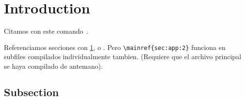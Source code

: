 \documentclass[../thesis/thesis.tex]{subfiles}
\begin{document}
\section{Introduction}\label{subsec:intro-another}

Citamos con este comando~\cite{kour2014fast}.

Referenciamos secciones con \ref{subsec:intro-another}, o . Pero \verb|\mainref{sec:app:2}| funciona en subfiles compilados individualmente tambien. (Requiere que el archivo principal se haya compilado de antemano).


\subsection{Subsection}

\lipsum[3-4]
\end{document}
